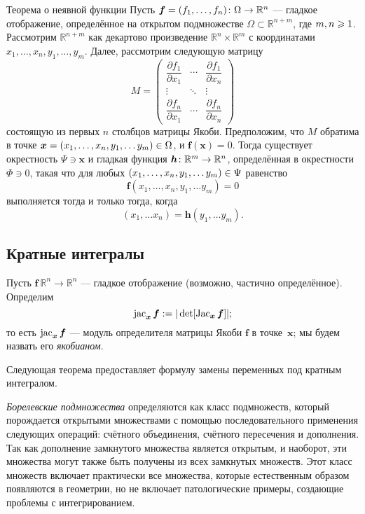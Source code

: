 \begin{multicols}{2}
{\begin{thm}{Теорема о неявной функции}\label{thm:imlicit}
Пусть $\bm{f}=(f_1,\dots,f_n)\:\Omega\z\to\mathbb{R}^n$ --- гладкое отображение, определённое на открытом подмножестве $\Omega\subset\mathbb{R}^{n+m}$, где
$m,n\z\ge 1$.
Рассмотрим $\mathbb{R}^{n+m}$ как декартово произведение $\mathbb{R}^n\times \mathbb{R}^m$ с координатами 
$x_1,\dots,x_n,y_1,\dots,y_m$.
Далее, рассмотрим следующую матрицу
\[
M=\begin{pmatrix}
\dfrac{\partial f_1}{\partial x_1} & \cdots & \dfrac{\partial f_1}{\partial x_n}\\
\vdots & \ddots & \vdots\\
\dfrac{\partial f_n}{\partial x_1} & \cdots & \dfrac{\partial f_n}{\partial x_n} \end{pmatrix}\]
состоящую из первых $n$ столбцов матрицы Якоби.
Предположим, что $M$ обратима в точке $\bm{x}\z=(x_1,\dots,x_n,y_1,\dots y_m)\in \Omega$, и $\bm{f}(\bm{x})=0$.
Тогда существует окрестность $\Psi\ni \bm{x}$
и гладкая функция $\bm{h}\:\mathbb{R}^m\z\to\mathbb{R}^n$, определённая в окрестности $\Phi\ni 0$, такая что
для любых $(x_1,\dots,x_n,y_1,\dots y_m)\z\in \Psi$ равенство
\[\bm{f}(x_1,\dots,x_n,y_1,\dots y_m)=0\]
выполняется тогда и только тогда, когда
\[(x_1,\dots x_n)=\bm{h}(y_1,\dots y_m).\]

\end{thm}

\subsection*{Кратные интегралы}

Пусть $\bm{f}\:\mathbb{R}^n\to\mathbb{R}^n$ --- гладкое отображение (возможно, частично определённое).
Определим
\[\jac_{\bm{x}}\bm{f}\df|\det[\Jac_{\bm{x}}\bm{f}]|;
\index{10j@$\jac$ (определитель Якоби)}\]
то есть $\mathop{\rm jac}\nolimits_{\bm{x}}\bm{f}$ --- модуль определителя матрицы Якоби $\bm{f}$ в точке~$\bm{x}$;
мы будем назвать его \emph{якобианом}.

Следующая теорема предоставляет формулу замены переменных под кратным интегралом.

\emph{Борелевские подмножества} определяются как класс подмножеств, который порождается открытыми множествами с помощью последовательного применения следующих операций: счётного объединения, счётного пересечения и дополнения.
Так как дополнение замкнутого множества является открытым, и наоборот, эти множества могут также быть получены из всех замкнутых множеств.
Этот класс множеств включает практически все множества, которые естественным образом появляются в геометрии, но не включает патологические примеры, создающие проблемы с интегрированием.

}
\end{multicols}
